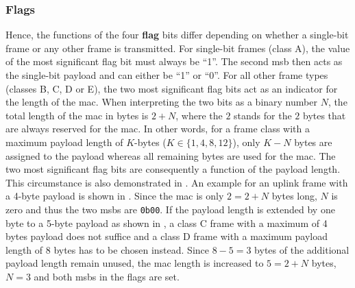 \subsubsection{Flags}
Hence, the functions of the four \textbf{flag} bits differ depending on whether a single-bit frame or any other frame is transmitted.
For single-bit frames (class A), the value of the most significant flag bit must always be ``1''.
The second \gls{msb} then acts as the single-bit payload and can either be ``1'' or ``0''.
For all other frame types (classes B, C, D or E), the two most significant flag bits act as an indicator for the length of the \gls{mac}.
When interpreting the two bits as a binary number $N$, the total length of the \gls{mac} in bytes is $2 + N$, where the $2$ stands for the $2$ bytes that are always reserved for the \gls{mac}.
In other words, for a frame class with a maximum payload length of $K$-bytes ($K \in \{ 1, 4, 8, 12\}$), only $K - N$ bytes are assigned to the payload whereas all remaining bytes are used for the \gls{mac}.
The two most significant flag bits are consequently a function of the payload length.
This circumstance is also demonstrated in .
An example for an uplink frame with a 4-byte payload is shown in .
Since the \gls{mac} is only $2 = 2 + N$ bytes long, $N$ is zero and thus the two \glspl{msb} are \texttt{0b00}.
If the payload length is extended by one byte to a 5-byte payload as shown in , a class C frame with a maximum of 4 bytes payload does not suffice and a class D frame with a maximum payload length of 8 bytes has to be chosen instead.
Since $8 - 5 = 3$ bytes of the additional payload length remain unused, the \gls{mac} length is increased to $5 = 2 + N$ bytes, $N = 3$ and both \glspl{msb} in the flags are set.

